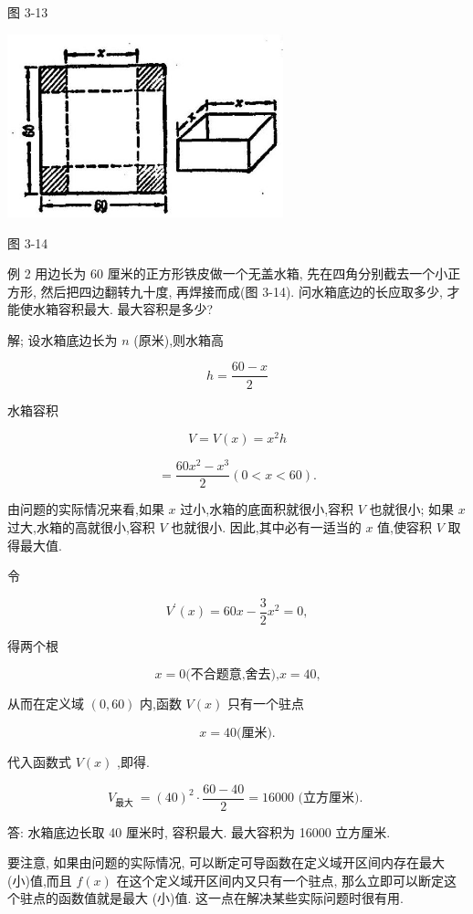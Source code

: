 \documentclass[lang=cn,newtx,10pt,scheme=chinese]{elegantbook}
\begin{document}
图 3-13

\begin{center}
\includegraphics[max width=0.6\textwidth]{images/01912c18-5c3f-733d-b775-749ba9897a9d_148_813570.jpg}
\end{center}

图 3-14

例 2 用边长为 60 厘米的正方形铁皮做一个无盖水箱, 先在四角分别截去一个小正方形, 然后把四边翻转九十度, 再焊接而成(图 3-14). 问水箱底边的长应取多少, 才能使水箱容积最大. 最大容积是多少?

解; 设水箱底边长为 \(n\) (原米),则水箱高

\[
h = \frac{{60} - x}{2}
\]

水箱容积

\[
V = V\left( x\right) = {x}^{2}h
\]

\[
= \frac{{60}{x}^{2} - {x}^{3}}{2}\left( {0 < x < {60}}\right) \text{.}
\]

由问题的实际情况来看,如果 \(x\) 过小,水箱的底面积就很小,容积 \(V\) 也就很小; 如果 \(x\) 过大,水箱的高就很小,容积 \(V\) 也就很小. 因此,其中必有一适当的 \(x\) 值,使容积 \(V\) 取得最大值.

令

\[
{V}^{\prime }\left( x\right) = {60x} - \frac{3}{2}{x}^{2} = 0,
\]

得两个根

\[
x = 0\text{(不合题意,舍去),}x = {40}\text{,}
\]

从而在定义域 \(\left( {0,{60}}\right)\) 内,函数 \(V\left( x\right)\) 只有一个驻点

\[
x = {40}\text{(厘米).}
\]

代入函数式 \(V\left( x\right)\) ,即得.

\[
{V}_{\text{最大 }} = {\left( {40}\right) }^{2} \cdot \frac{{60} - {40}}{2} = {16000}\text{ (立方厘米). }
\]

答: 水箱底边长取 40 厘米时, 容积最大. 最大容积为 16000 立方厘米.

要注意, 如果由问题的实际情况, 可以断定可导函数在定义域开区间内存在最大 (小)值,而且 \(f\left( x\right)\) 在这个定义域开区间内又只有一个驻点, 那么立即可以断定这个驻点的函数值就是最大 (小)值. 这一点在解决某些实际问题时很有用.
\end{document}
